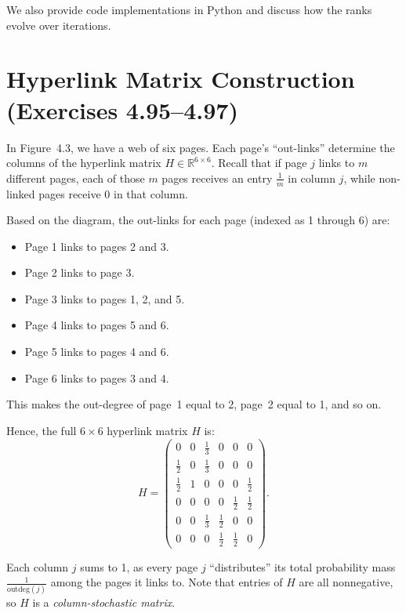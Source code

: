 \documentclass{article}
\begin{document}
We also provide code implementations in Python and discuss how the ranks evolve over iterations.

\section{Hyperlink Matrix Construction (Exercises 4.95--4.97)}

In Figure~4.3, we have a web of six pages. Each page's ``out-links'' determine the columns of the hyperlink matrix 
$H \in \mathbb{R}^{6 \times 6}$. Recall that if page $j$ links to $m$ different pages, each of those $m$ pages 
receives an entry $\tfrac{1}{m}$ in column $j$, while non-linked pages receive $0$ in that column.

Based on the diagram, the out-links for each page (indexed as 1 through 6) are:
\begin{itemize}
  \item Page 1 links to pages 2 and 3.
  \item Page 2 links to page 3.
  \item Page 3 links to pages 1, 2, and 5.
  \item Page 4 links to pages 5 and 6.
  \item Page 5 links to pages 4 and 6.
  \item Page 6 links to pages 3 and 4.
\end{itemize}
This makes the out-degree of page~1 equal to 2, page~2 equal to 1, and so on.

\bigskip

Hence, the full $6 \times 6$ hyperlink matrix $H$ is:
\[
H 
= 
\begin{pmatrix}
0      & 0      & \tfrac{1}{3} & 0          & 0          & 0 \\
\tfrac{1}{2} & 0      & \tfrac{1}{3} & 0          & 0          & 0 \\
\tfrac{1}{2} & 1      & 0           & 0          & 0          & \tfrac{1}{2} \\
0      & 0      & 0           & 0          & \tfrac{1}{2} & \tfrac{1}{2} \\
0      & 0      & \tfrac{1}{3} & \tfrac{1}{2} & 0          & 0 \\
0      & 0      & 0           & \tfrac{1}{2} & \tfrac{1}{2} & 0
\end{pmatrix}.
\]

\noindent
Each column $j$ sums to 1, as every page $j$ ``distributes'' its total probability mass $\tfrac{1}{\text{outdeg}(j)}$ 
among the pages it links to. Note that entries of $H$ are all nonnegative, so $H$ is a \emph{column-stochastic matrix}.
\end{document}
